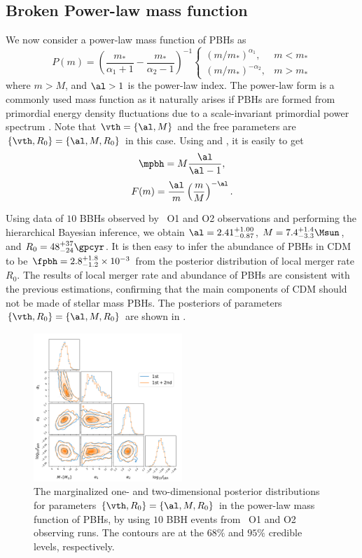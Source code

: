 \documentclass[
reprint,           %
superscriptaddress,%
amsmath,           %
amssymb,           %
aps,               %
prd,               %
notitlepage,       %
longbibliography,  %
floatfix,          %
showkeys,          %
]{revtex4-1}
\def\({\left(}
\def\){\right)}
\def\e{\begin{equation}}
\def\q{\end{equation}}
\begin{document}
\subsection{Broken Power-law mass function}
We now consider a power-law mass function of PBHs as \cite{Carr:1975qj}
\begin{equation}
	P(m)= \left(\frac{m_*}{\alpha_1+1}-\frac{m_*}{\alpha_2-1}\right)^{-1} \begin{cases}\left(m / m_*\right)^{\alpha_1}, & m<m_* \\ \left(m / m_*\right)^{-\alpha_2}, & m>m_*\end{cases}
\end{equation}
where $m>M$, and $\al>1$ is the power-law index. The power-law form is a commonly used mass function as it naturally arises if PBHs are formed from primordial energy density fluctuations due to a scale-invariant primordial power spectrum \cite{Carr:2016drx,Carr:2017jsz}.
Note that $\vth=\{\al, M\}$ and the free parameters are 
$\{\vth, R_0\} = \{\al, M, R_0\}$ in this case. 
Using  and , it is easily to get
\e
\mpbh = M \frac{\al}{\al-1},
\q
\e 
F(m) = \frac{\al}{m} \(\frac{m}{M}\)^{-\al}.
\q

Using data of $10$ BBHs observed by \lvc\ O1 and O2 observations and performing
the hierarchical Bayesian inference, we obtain $\al = 2.41^{+1.00}_{-0.87}$,
$M = 7.4^{+1.4}_{-3.3} \Msun$, and $R_0 = 48^{+37}_{-24} \gpcyr$.
It is then easy to infer the abundance of PBHs in CDM to be 
$\fpbh = 2.8^{+1.8}_{-1.2} \times 10^{-3}$ from the posterior distribution of local merger rate $R_0$.
The results of local merger rate and abundance of PBHs are consistent with
the previous estimations, confirming that the main components of CDM should
not be made of stellar mass PBHs.
The posteriors of parameters $\{\vth, R_0\} = \{\al, M, R_0\}$ are shown 
in .

\begin{figure}[htbp!]
	\centering
	\includegraphics[width=0.5\textwidth]{post-bpower.pdf}
	\caption{\label{posterior-bpower}
		The marginalized one- and two-dimensional posterior distributions for 
		parameters $\{\vth, R_0\} = \{\al, M, R_0\}$ in the power-law mass function 
		of PBHs, by using $10$ BBH events from \lvc\ O1 and O2 observing runs.
		The contours are at the $68\%$ and $95\%$ credible levels, respectively. 
	}
\end{figure}
\end{document}

